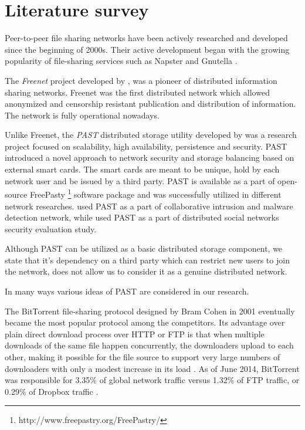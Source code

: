 \section{Literature survey}

Peer-to-peer file sharing networks have been actively researched and
developed since the beginning of 2000s. Their active development began
with the growing popularity of file-sharing services such as Napster
\citep{napster} and Gnutella \citep{gnutella}.

The \emph{Freenet} project developed by \citet{freenet}, was
a pioneer of distributed information sharing networks.
Freenet was the first distributed network which allowed anonymized
and censorship resistant publication and distribution of information.
The network is fully operational nowadays.

Unlike Freenet, the \emph{PAST} distributed storage utility
developed by \citet{past} was a research project focused
on scalability, high availability, persistence
and security. PAST introduced a novel approach to \pp network
security and storage balancing based on external smart cards.
The smart cards are meant to be unique, hold by each network
user and be issued by a third party.
PAST is available as a part of open-source FreePasty
\footnote{http://www.freepastry.org/FreePastry/} software package
and was successfully utilized in different \pp network researches.
\citet{p2p-intrusion} used PAST as a part of \pp collaborative
intrusion and malware detection network, while 
\citet{p2p-social-security} used PAST as a part of distributed
social networks security evaluation study.

Although PAST can be utilized as a basic distributed storage
component, we state that it's dependency on a third party
which can restrict new users to join the network, does not allow
us to consider it as a genuine distributed network.


In many ways various ideas of PAST are
considered in our research.

The BitТorrent file-sharing protocol designed by Bram Cohen
in 2001 eventually became the most popular protocol among
the competitors.
Its advantage over plain direct download process over HTTP or FTP
is that when multiple downloads of the same file happen concurrently,
the downloaders upload to each other, making it possible for the file
source to support very large numbers of downloaders with only a modest
increase in its load \cite{bittorrent-specs}.
As of June 2014, BitTorrent was responsible for 3.35\% of global
network traffic versus 1.32\% of FTP traffic, or 0.29\% of
Dropbox traffic \cite{paloalto-traffic}.

